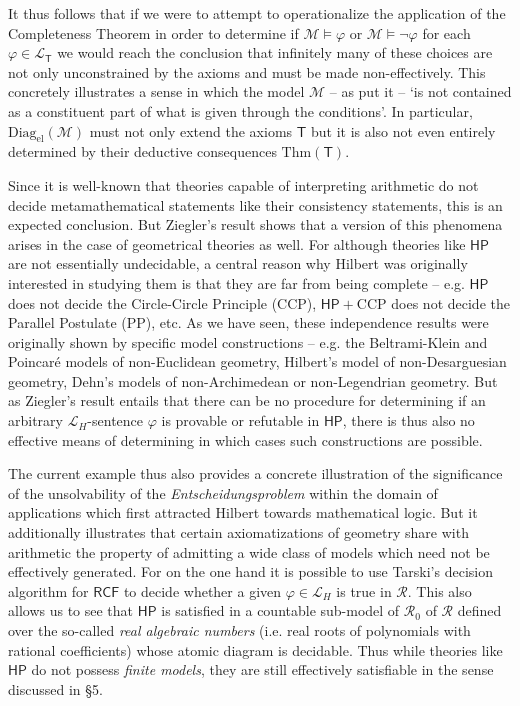 \documentclass[11pt,fleqn,leqno]{article}
\def\phi{\varphi}
\begin{document}
It thus follows that if we were to attempt to operationalize the application of the Completeness Theorem in order to determine if $\mathcal{M} \models \phi$ or $\mathcal{M} \models \neg\phi$ for each $\phi \in \mathcal{L}_{\mathsf{T}}$ we would reach the conclusion that infinitely many of these choices are not only unconstrained by the axioms and must be made non-effectively.    This concretely illustrates a sense in which the model $\mathcal{M}$ -- as \citet{Bernays1950} put it --  `is not contained as a constituent part of what is given through the conditions'.  In particular,   $\mathrm{Diag}_{\mathrm{el}}(\mathcal{M})$ must not only extend the axioms  $\mathsf{T}$ but it is also not even entirely determined by their deductive consequences $\mathrm{Thm}(\mathsf{T})$.  

Since it is well-known that theories capable of interpreting arithmetic do not decide metamathematical statements like their consistency statements,  this is an expected conclusion.   But Ziegler's result shows that a version of this phenomena arises in the case of geometrical theories as well.   For although  theories like $\mathsf{HP}$ are not essentially undecidable, a central reason why Hilbert was originally interested in studying them is that they are far from being complete -- e.g. $\mathsf{HP}$ does not decide the Circle-Circle Principle (CCP), $\mathsf{HP} + \mathrm{CCP}$ does not decide the Parallel Postulate (PP), etc.  As we have seen, these independence results  were originally shown by specific model constructions -- e.g. the Beltrami-Klein and Poincar\'e models of non-Euclidean geometry, Hilbert's model of non-Desarguesian geometry, Dehn's models of non-Archimedean or non-Legendrian geometry.   But as Ziegler's result entails that there can be no procedure for determining if an arbitrary $\mathcal{L}_{H}$-sentence $\phi$ is provable or refutable in $\mathsf{HP}$, there is thus also no effective means of determining in which cases such constructions are possible.


The current example thus also provides a concrete illustration of the significance of the unsolvability of the \textsl{Entscheidungsproblem} within the domain of applications which first attracted Hilbert towards mathematical logic.     But it additionally illustrates that certain axiomatizations of geometry share with arithmetic the property of admitting a wide class of models which need not be effectively generated.   For on the one hand it is possible to use Tarski's decision algorithm for $\mathsf{RCF}$ to decide whether a given $\phi \in \mathcal{L}_{H}$ is true in $\mathcal{R}$.  This also allows us to see that $\mathsf{HP}$ is satisfied in a countable sub-model of $\mathcal{R}_0$ of $\mathcal{R}$ defined over the so-called \textsl{real algebraic numbers} (i.e. real roots of polynomials with rational coefficients) whose atomic diagram is decidable.   Thus while theories like $\mathsf{HP}$ do not possess \textsl{finite models}, they are still effectively satisfiable in the sense discussed in \S 5.   
\end{document}
